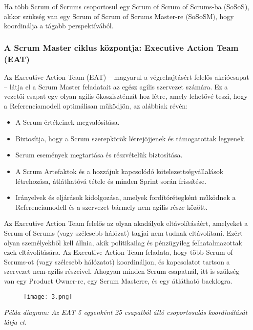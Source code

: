 \documentclass[12pt,a4paper,parskip=full]{scrartcl}
\begin{document}
Ha több Scrum of Scrums csoportosul egy Scrum of Scrum of Scrums-ba (SoSoS), akkor szükség van egy Scrum of Scrum of Scrums Master-re (SoSoSM), hogy koordinálja a tágabb perspektívából.

\subsubsection{A Scrum Master ciklus központja: Executive Action Team (EAT)}\label{the-hub-of-the-sm-cycle}

Az Executive Action Team (EAT) – magyarul a végrehajtásért felelős akciócsapat – látja el a Scrum Master feladatait az egész agilis szervezet számára. Ez a vezetői csapat egy olyan agilis ökoszisztémát hoz létre, amely lehetővé teszi, hogy a Referenciamodell optimálisan működjön, az alábbiak révén:

\begin{itemize}
\itemsep1pt\parskip0pt
\item
 A Scrum értékeinek megvalósítása.
\item
 Biztosítja, hogy a Scrum szerepkörök létrejöjjenek és támogatottak legyenek.
\item
 Scrum események megtartása és részvételük biztosítása.
\item
 A Scrum Artefaktok és a hozzájuk kapcsolódó kötelezettségvállalások létrehozása, átláthatóvá tétele és minden Sprint során frissítése.
\item
 Irányelvek és eljárások kidolgozása, amelyek fordítórétegként működnek a Referenciamodell és a szervezet bármely nem-agilis része között.
\end{itemize}

Az Executive Action Team felelős az olyan akadályok eltávolításáért, amelyeket a Scrum of Scrums (vagy szélesebb hálózat) tagjai nem tudnak eltávolítani. Ezért olyan személyekből kell állnia, akik politikailag és pénzügyileg felhatalmazottak ezek eltávolítására. Az Executive Action Team feladata, hogy több Scrum of Scrums-ot (vagy szélesebb hálózatot) koordináljon, és kapcsolatot tartson a szervezet nem-agilis részeivel. Ahogyan minden Scrum csapatnál, itt is szükség van egy Product Owner-re, egy Scrum Masterre, és egy átlátható backlogra.

\begin{figure}[H]
    \centering
    \texttt{[image: 3.png]}
\end{figure}

\emph{Példa diagram: Az EAT 5 egyenként 25 csapatból álló csoportosulás koordinálását látja el.}
\end{document}

